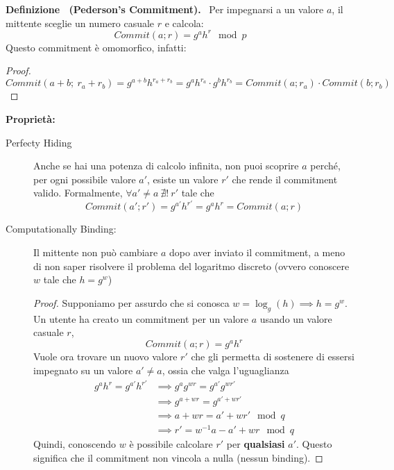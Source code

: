 \documentclass[a4paper, 11pt]{article}
\newenvironment{definition}[1][]{
  \par\noindent\textbf{Definizione%
  \if\relax\detokenize{#1}\relax\else\ (\textbf{#1})\fi.}\ }{}
\begin{document}
\begin{definition}[Pederson's Commitment]
    Per impegnarsi a un valore $a$, il mittente sceglie un numero casuale $r$ e calcola:
    \[
    Commit(a; r) = g^ah^r \mod p
    \]
    Questo commitment è omomorfico, infatti:
    \begin{proof}
        \[
            Commit(a + b;\ r_a + r_b) = g^{a+b}h^{r_a + r_b} = g^ah^{r_a} \cdot g^bh^{r_b} = Commit(a; r_a) \cdot Commit(b; r_b)
        \]
    \end{proof}

    \textbf{Proprietà:}
    \begin{description}
        \item[Perfecty Hiding] Anche se hai una potenza di calcolo infinita, non puoi scoprire $a$ perché, per ogni possibile valore $a'$, esiste un valore $r'$ che rende il commitment valido.
        Formalmente, $\forall a' \neq a\ \nexists!\ r'$ tale che
        \[
            Commit(a'; r') = g^{a'}h^{r'} = g^ah^r = Commit(a; r)
        \]
        \item[Computationally Binding:] Il mittente non può cambiare $a$ dopo aver inviato il commitment, a meno di non saper risolvere il problema del logaritmo discreto (ovvero conoscere $w$ tale che $h=g^w$)
        \begin{proof}
            Supponiamo per assurdo che si conosca $w = \log_g(h) \implies h = g^w$. 
            Un utente ha creato un commitment per un valore $a$ usando un valore casuale $r$,
            \[
                Commit(a;r) = g^ah^r
            \]
            Vuole ora trovare un nuovo valore $r'$ che gli permetta di sostenere di essersi impegnato su un valore $a' \neq a$, ossia che valga l'uguaglianza
            \begin{align*}
                g^ah^r = g^{a'}h^{r'} 
                &\implies g^ag^{wr} = g^{a'}g^{wr'} \\ 
                &\implies g^{a + wr} = g^{a' + wr'} \\
                &\implies a + wr = a' + wr' \mod q \\
                &\implies r' = w^{-1}a - a' + wr \mod q
            \end{align*}
            Quindi, conoscendo $w$ è possibile calcolare $r'$ per \textbf{qualsiasi} $a'$. Questo significa che il commitment non vincola a nulla (nessun binding).
        \end{proof}
    \end{description}
\end{definition}
\end{document}
